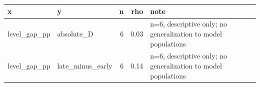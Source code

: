 \begin{tabular}{llrrl}
\toprule
x & y & n & rho & note \\
\midrule
level\_gap\_pp & absolute\_D & 6 & 0.03 & n=6, descriptive only; no generalization to model populations \\
level\_gap\_pp & late\_minus\_early & 6 & 0.14 & n=6, descriptive only; no generalization to model populations \\
\bottomrule
\end{tabular}
